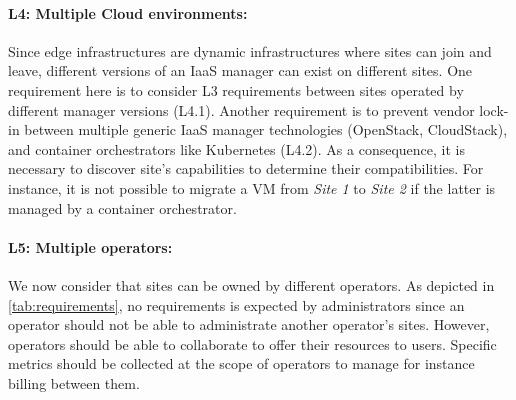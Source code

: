 \paragraph{L4: Multiple Cloud environments:}
Since edge infrastructures are dynamic infrastructures where sites can join and
leave, different versions of an IaaS manager can exist on different sites. One
requirement here is to consider L3 requirements between sites operated by
different manager versions (L4.1). Another requirement is to prevent vendor
lock-in between multiple generic IaaS manager technologies (\eg OpenStack,
CloudStack), and container orchestrators like Kubernetes (L4.2).
As a consequence, it is necessary to discover site's capabilities to determine
their compatibilities. For instance, it is not possible to migrate a VM from
\emph{Site 1} to \emph{Site 2} if the latter is managed by a container
orchestrator.

\paragraph{L5: Multiple operators:}
We now consider that sites can be owned by different operators. As depicted in
\cref{tab:requirements}, no requirements is expected by administrators since an
operator should not be able to administrate another operator's sites. However,
operators should be able to collaborate to offer their resources to users.
Specific metrics should be collected at the scope of operators to manage for
instance billing between them.

